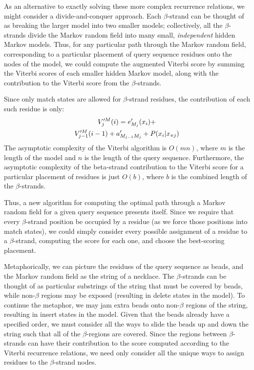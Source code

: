 \documentclass{acm_proc_article-sp}
\begin{document}
As an alternative to exactly solving these more complex recurrence
relations, we might consider a divide-and-conquer approach.  Each
$\beta$-strand can be thought of as breaking the larger model into two
smaller models; collectively, all the $\beta$-strands divide the
Markov random field into many small, \emph{independent} hidden Markov
models.  Thus, for any particular path through the Markov random
field, corresponding to a particular placement of query sequence
residues onto the nodes of the model, we could compute the augmented
Viterbi score by summing the Viterbi scores of each smaller hidden
Markov model, along with the contribution to the Viterbi score from
the $\beta$-strands.

Since only match states are allowed for $\beta$-strand residues, the 
contribution of each such residue is only:
\begin{multline*}
  V_{j}^{\prime M}(i) = e^{\prime}_{M_{j}}(x_{i}) + \notag\\
V_{j-1}^{\prime M}(i - 1) + a^{\prime}_{M_{j-1}M_{j}} + P(x_{i}|x_{\pi j})
\end{multline*}
The asymptotic complexity of the Viterbi algorithm is $O(mn)$, where $m$ is the
length of the model and $n$ is the length of the query sequence.
Furthermore, the asymptotic complexity of the beta-strand contribution to the
Viterbi score for a particular placement of residues is just $O(b)$, where $b$
is the combined length of the $\beta$-strands.

Thus, a new algorithm for computing the optimal path through a Markov random 
field for a given query sequence presents itself.
Since we require that every $\beta$-strand position be occupied by a residue 
(as we force those positions into match states), we could simply consider every
possible assignment of a residue to a $\beta$-strand, computing the score for 
each one, and choose the best-scoring placement.

Metaphorically, we can picture the residues of the query sequence as beads,
and the Markov random field as the string of a necklace.
The $\beta$-strands can be thought of as particular substrings of the string 
that
must be covered by beads, while non-$\beta$ regions may be exposed (resulting in
delete states in the model).
To continue the metaphor, we may jam extra beads onto non-$\beta$ regions of the
string, resulting in insert states in the model.
Given that the beads already have a specified order, we must consider all the
ways to slide the beads up and down the string such that all of the 
$\beta$-regions
are covered.
Since the regions between $\beta$-strands can have their contribution to the
score computed according to the Viterbi recurrence relations, we need only
consider all the unique ways to assign residues to the $\beta$-strand nodes.
\end{document}
